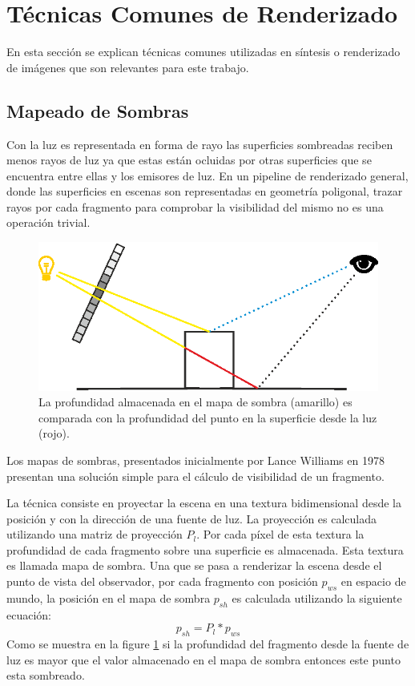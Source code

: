 
\section{Técnicas Comunes de Renderizado}
En esta sección se explican técnicas comunes utilizadas en síntesis o renderizado de imágenes que son relevantes para este trabajo.
\subsection{Mapeado de Sombras}
\label{subsec:shadowmapping}
Con la luz es representada en forma de rayo las superficies sombreadas reciben menos rayos de luz ya que estas están ocluidas por otras superficies que se encuentra entre ellas y los emisores de luz. En un pipeline de renderizado general, donde las superficies en escenas son representadas en geometría poligonal, trazar rayos por cada fragmento para comprobar la visibilidad del mismo no es una operación trivial.
\begin{figure}[H]
	\centering
	\includegraphics[width=0.85\linewidth]{media/shadow_mapping.eps}
	\caption{La profundidad almacenada en el mapa de sombra (amarillo) es comparada con la profundidad del punto en la superficie desde la luz (rojo).}
	\label{fig:shadow_mapping}
\end{figure}
Los mapas de sombras, presentados inicialmente por Lance Williams en 1978 \cite{Williams:78} presentan una solución simple para el cálculo de visibilidad de un fragmento.

La técnica consiste en proyectar la escena en una textura bidimensional desde la posición y con la dirección de una fuente de luz. La proyección es calculada utilizando una matriz de proyección $P_{l}$. Por cada píxel de esta textura la profundidad de cada fragmento sobre una superficie es almacenada. Esta textura es llamada mapa de sombra.
Una que se pasa a renderizar la escena desde el punto de vista del observador, por cada fragmento con posición $p_{ws}$ en espacio de mundo, la posición en el mapa de sombra $p_{sh}$ es calculada utilizando la siguiente ecuación:
\begin{equation}
    p_{sh} = P_{l} * p_{ws}
    \label{eq:p_to_shadowmap}
\end{equation}
Como se muestra en la figure \ref{fig:shadow_mapping} si la profundidad del fragmento desde la fuente de luz es mayor que el valor almacenado en el mapa de sombra entonces este punto esta sombreado. 

